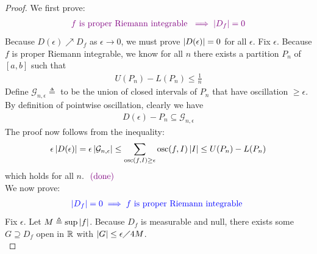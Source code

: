 \documentclass{report}
\begin{document}
\begin{proof}
We first prove: 
\begin{align*}
  \textcolor{violet}{f\text{ is proper Riemann integrable }\implies \left|D_f\right|=0}
\end{align*}
Because $D(\epsilon )\nearrow D_f$ as $\epsilon \rightarrow 0$, we must prove $\left|D(\epsilon)\right|=0$ for all $\epsilon $. Fix $\epsilon $. Because $f$ is proper Riemann integrable, we know for all $n$ there exists a partition $P_n$ of $[a,b]$ such that  
\begin{align*}
 U(P_n)-L(P_n)\leq \frac{1}{n}   
\end{align*}
Define $\mathcal{G}_{n,\epsilon }\triangleq $ to be the union of closed intervals of $P_n$ that have oscillation  $\geq \epsilon $. By definition of pointwise oscillation, clearly we have
\begin{align*}
D(\epsilon )-P_n \subseteq \mathcal{G}_{n,\epsilon } 
\end{align*}
The proof now follows from  the inequality:
\begin{align*}
\epsilon \left|D(\epsilon )\right| = \epsilon \left|\mathcal{G}_{n,\epsilon } \right|\leq \sum_{\operatorname{osc}(f,I)\geq \epsilon }\operatorname{osc}(f,I)\left|I\right| \leq U(P_n)-L(P_n)
\end{align*}
which holds for all $n$. $\textcolor{violet}{\text{ (done) }}$ \\

We now prove: 
\begin{align*}
\textcolor{blue}{\left|D_f\right|=0 \implies f\text{ is proper Riemann integrable }}
\end{align*}
Fix $\epsilon $. Let $M\triangleq \sup \left|f\right|$. Because $D_f$ is measurable and null, there exists some $G\supseteq D_f$ open in $\mathbb{R}$ with $\left|G\right|\leq \epsilon \diagup 4M$. \\


\end{proof}
\end{document}
